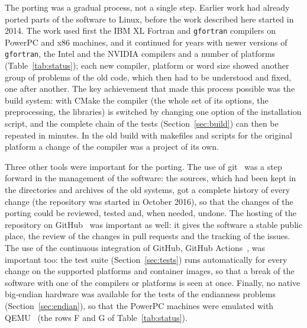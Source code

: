 The porting was a gradual process, not a single step. Earlier work had already ported parts of the software to Linux, before the work described here started in 2014. The work used first the IBM XL Fortran and \texttt{gfortran} compilers
on PowerPC and x86 machines, and it continued for years with newer versions of \texttt{gfortran}, the Intel and the NVIDIA
compilers and a number of platforms (Table~\ref{tab:status}); each new compiler, platform or word size showed another group
of problems of the old code, which then had to be understood and fixed, one after another. The key achievement that made this
process possible was the build system: with CMake the compiler (the whole set of its options, the preprocessing, the libraries)
is switched by changing one option of the installation script, and the complete chain of the tests (Section~\ref{sec:build})
can then be repeated in minutes. In the old build with makefiles and scripts for the original platform a change of the compiler
was a project of its own.

Three other tools were important for the porting. The use of git~\cite{Git:web,Wiki:Git} was a step forward in the management of the
software: the sources, which had been kept in the directories and archives of the old systems, got a complete history of every change (the repository was started in
October 2016), so that the changes of the porting could be reviewed, tested and, when needed, undone. The hosting of the repository on
GitHub~\cite{GitHub:web,Wiki:GitHub} was important as well: it gives the software a stable public place, the review of the changes
in pull requests and the tracking of the issues. The use of the continuous integration of GitHub, GitHub Actions~\cite{GitHubActions:web}, was important
too: the test suite (Section~\ref{sec:tests}) runs automatically for every change on the supported platforms and container images, so that a break
of the software with one of the compilers or platforms is seen at once. Finally, no native big-endian hardware was available for
the tests of the endianness problems (Section~\ref{sec:endian}), so that the PowerPC machines were emulated with QEMU~\cite{Bellard:2005qemu}
(the rows F and G of Table~\ref{tab:status}).

